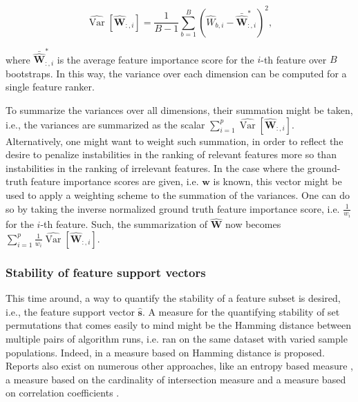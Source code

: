 \documentclass{article}
\begin{document}
\begin{equation}
\widehat{\operatorname{Var}}[\hat{\mathbf{W}}_{:,i}]=\frac{1}{B-1} \sum_{b=1}^{B}\left(\hat{W}_{b,i}-\bar{\hat{\mathbf{W}}}_{:,i}^{*}\right)^{2},
\end{equation}

where $\bar{\hat{\mathbf{W}}}_{:,i}^{*}$ is the average feature importance score for the $i$-th feature over $B$ bootstraps. In this way, the variance over each dimension can be computed for a single feature ranker.

To summarize the variances over all dimensions, their summation might be taken, i.e., the variances are summarized as the scalar $\sum_{i=1}^p \widehat{\operatorname{Var}}[\hat{\mathbf{W}}_{:,i}]$. Alternatively, one might want to weight such summation, in order to reflect the desire to penalize instabilities in the ranking of relevant features more so than instabilities in the ranking of irrelevant features. In the case where the ground-truth feature importance scores are given, i.e. $\boldsymbol{w}$ is known, this vector might be used to apply a weighting scheme to the summation of the variances. One can do so by taking the inverse normalized ground truth feature importance score, i.e. $\frac{1}{w_i}$ for the $i$-th feature. Such, the summarization of $\hat{\mathbf{W}}$ now becomes $\sum_{i=1}^p \frac{1}{w_i} \widehat{\operatorname{Var}}[\hat{\mathbf{W}}_{:,i}]$.

\subsubsection{Stability of feature support vectors}
This time around, a way to quantify the stability of a feature subset is desired, i.e., the feature support vector $\hat{\boldsymbol{s}}$. A measure for the quantifying stability of set permutations that comes easily to mind might be the Hamming distance between multiple pairs of algorithm runs, i.e. ran on the same dataset with varied sample populations. Indeed, in \citep{dunne_solutions_2002} a measure based on Hamming distance is proposed. Reports also exist on numerous other approaches, like an entropy based measure \citep{krizek_improving_2007}, a measure based on the cardinality of intersection measure \citep{kuncheva_stability_2007} and a measure based on correlation coefficients \citep{kalousis_stability_2007}.
\end{document}
